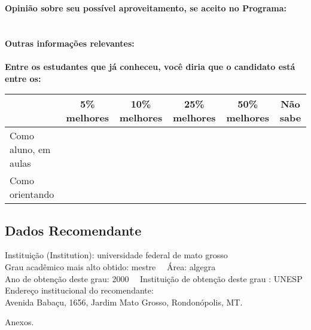 \documentclass[11pt]{article}
\begin{document}
\textbf{Opinião sobre seu possível aproveitamento, se aceito no Programa:}
\\\\ 
\\
\textbf{Outras informações relevantes:} \\
\\[0.3cm]
\textbf{Entre os estudantes que já conheceu, você diria que o candidato está entre os:}
\\
\begin{tabular}{|l|c|c|c|c|c|}
\hline
 & 5\% melhores & 10\% melhores & 25\% melhores & 50\% melhores & Não sabe \\
\hline
Como aluno, em aulas &  &  &  &  & \\
\hline
Como orientando &  &  &  &  & \\
\hline
\end{tabular}
\subsection*{Dados Recomendante} 
	Instituição (Institution): universidade federal de mato grosso
\\ 
	Grau acadêmico mais alto obtido: mestre
	\ \ Área: algegra
	\\
	Ano de obtenção deste grau: 2000
	\ \ 
	Instituição de obtenção deste grau : UNESP
	\\ 
	Endereço institucional do recomendante: \\ Avenida Babaçu, 1656, Jardim Mato Grosso, Rondonópolis, MT. 
\begin{center}
Anexos.
\end{center}
\end{document}
